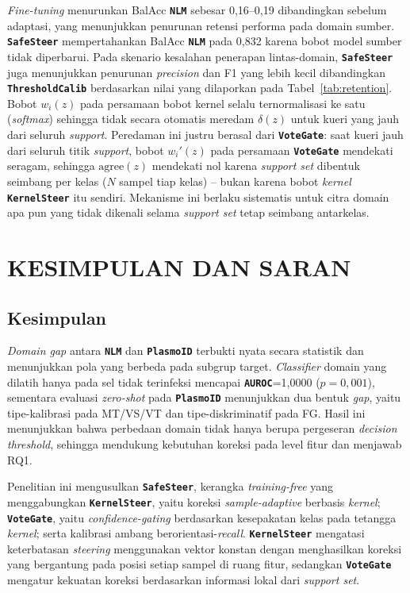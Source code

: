 \documentclass[conference]{IEEEtran}
\newcommand{\nama}[1]{\textbf{\texttt{#1}}}
\begin{document}
\textit{Fine-tuning} menurunkan BalAcc \nama{NLM} sebesar 0,16--0,19 dibandingkan sebelum adaptasi, yang menunjukkan penurunan retensi performa pada domain sumber. \nama{SafeSteer} mempertahankan BalAcc \nama{NLM} pada 0,832 karena bobot model sumber tidak diperbarui. Pada skenario kesalahan penerapan lintas-domain, \nama{SafeSteer} juga menunjukkan penurunan \textit{precision} dan F1 yang lebih kecil dibandingkan \nama{ThresholdCalib} berdasarkan nilai yang dilaporkan pada Tabel~\ref{tab:retention}. Bobot $w_i(z)$ pada persamaan bobot kernel selalu ternormalisasi ke satu (\textit{softmax}) sehingga tidak secara otomatis meredam $\delta(z)$ untuk kueri yang jauh dari seluruh \textit{support}. Peredaman ini justru berasal dari \nama{VoteGate}: saat kueri jauh dari seluruh titik \textit{support}, bobot $w_i'(z)$ pada persamaan \nama{VoteGate} mendekati seragam, sehingga $\text{agree}(z)$ mendekati nol karena \textit{support set} dibentuk seimbang per kelas ($N$ sampel tiap kelas) -- bukan karena bobot \textit{kernel} \nama{KernelSteer} itu sendiri. Mekanisme ini berlaku sistematis untuk citra domain apa pun yang tidak dikenali selama \textit{support set} tetap seimbang antarkelas.

\section{KESIMPULAN DAN SARAN}

\subsection{Kesimpulan}
\textit{Domain gap} antara \nama{NLM} dan \nama{PlasmoID} terbukti nyata secara statistik dan menunjukkan pola yang berbeda pada subgrup target. \textit{Classifier} domain yang dilatih hanya pada sel tidak terinfeksi mencapai \nama{AUROC}=1,0000 ($p=0{,}001$), sementara evaluasi \textit{zero-shot} pada \nama{PlasmoID} menunjukkan dua bentuk \textit{gap}, yaitu tipe-kalibrasi pada MT/VS/VT dan tipe-diskriminatif pada FG. Hasil ini menunjukkan bahwa perbedaan domain tidak hanya berupa pergeseran \textit{decision threshold}, sehingga mendukung kebutuhan koreksi pada level fitur dan menjawab RQ1.

Penelitian ini mengusulkan \nama{SafeSteer}, kerangka \textit{training-free} yang menggabungkan \nama{KernelSteer}, yaitu koreksi \textit{sample-adaptive} berbasis \textit{kernel}; \nama{VoteGate}, yaitu \textit{confidence-gating} berdasarkan kesepakatan kelas pada tetangga \textit{kernel}; serta kalibrasi ambang berorientasi-\textit{recall}. \nama{KernelSteer} mengatasi keterbatasan \textit{steering} menggunakan vektor konstan dengan menghasilkan koreksi yang bergantung pada posisi setiap sampel di ruang fitur, sedangkan \nama{VoteGate} mengatur kekuatan koreksi berdasarkan informasi lokal dari \textit{support set}.
\end{document}
